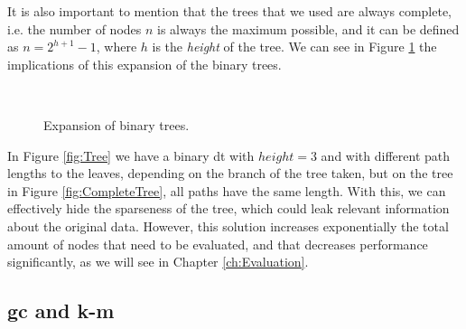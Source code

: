 It is also important to mention that the trees that we used are always complete, i.e. the number of nodes $n$ is always the maximum possible, and it can be defined as $n=2^{h+1}-1$, where $h$ is the \textit{height} of the tree. We can see in Figure \ref{fig:ExpansionBinaryTrees} the implications of this expansion of the binary trees.
\begin{figure}[ht]
	\centering
	\mbox{
	}
	\caption{Expansion of binary trees.}
    \label{fig:ExpansionBinaryTrees}
\end{figure}


In Figure \ref{fig:Tree} we have a binary \ac{dt} with $height=3$ and with different path lengths to the leaves, depending on the branch of the tree taken, but on the tree in Figure \ref{fig:CompleteTree}, all paths have the same length. With this, we can effectively hide the sparseness of the tree, which could leak relevant information about the original data. However, this solution increases exponentially the total amount of nodes that need to be evaluated, and that decreases performance significantly, as we will see in Chapter \ref{ch:Evaluation}.
                


\subsection{\acl{gc} and \acl{k-m}}
\label{ssec:GCandk-M}



